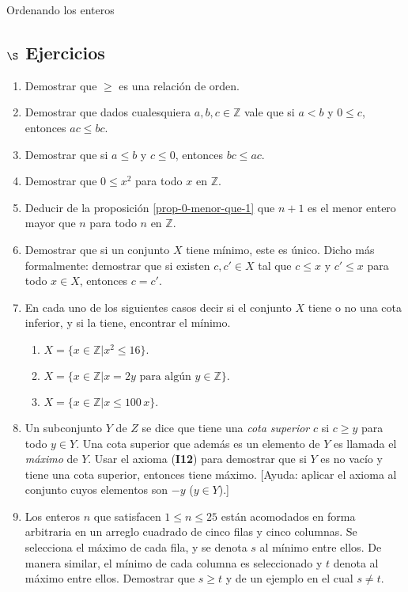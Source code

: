 \begin{section}{Ordenando los enteros}
\subsection*{$\S$ Ejercicios}
\begin{enumerate}
    \item Demostrar que $\ge$ es una relación de orden.
        
    \item Demostrar que dados cualesquiera $a,b,c \in \mathbb Z$ vale que si $a< b$ y $0\le c$, entonces $ac \le bc$. 
        
    \item Demostrar que si $a\le b$ y $c\le 0$, entonces $bc \le ac$.
        
    \item Demostrar que $0\le x^2$ para todo $x$ en $\mathbb Z$.
        
    \item Deducir de la proposición \ref{prop-0-menor-que-1} que $n+1$ es el menor entero mayor que $n$ para todo $n$ en $\mathbb Z$.

    \item Demostrar que si un conjunto $X$ tiene mínimo, este es único. Dicho más formalmente: demostrar que si existen $c,c' \in X$ tal que  $c\le x$ y $c'\le x$ para todo $x \in X$, entonces $c=c'$. 

    \item En cada uno de los siguientes casos decir si el conjunto $X$ tiene o no una cota inferior, y si la tiene, encontrar el mínimo.
    \begin{enumerate}
        \item $X = \{x \in \mathbb Z | x^2\le 16\}.$
        \item $X =\{x \in \mathbb Z | x=2y \text{\ para algún } y \in \mathbb Z\}.$
        \item $X =\{x \in \mathbb Z | x\le 100\,x\} .$
    \end{enumerate}
    \item Un subconjunto $Y$ de $Z$ se dice que tiene una {\em cota superior} $c$ si $c\ge y$ para todo $y \in Y$.  Una cota superior que además es un elemento de $Y$ es llamada el {\em máximo} de $Y$. Usar el axioma (\textbf{I12}) para demostrar que si $Y$ es no vacío y tiene una cota superior, entonces tiene máximo. [Ayuda: aplicar el axioma al conjunto cuyos elementos son $-y$ ($y \in Y$).]

    \item Los enteros $n$ que satisfacen $1 \le n \le 25$ están acomodados en forma arbitraria en un arreglo cuadrado de cinco filas y cinco columnas. Se selecciona el máximo  de cada fila, y se denota $s$ al mínimo entre ellos. De manera similar, el mínimo de cada columna es seleccionado y $t$ denota al máximo entre ellos. Demostrar que $s\ge t$ y de un ejemplo en el cual $s\not=t$.
\end{enumerate}

\end{section}

